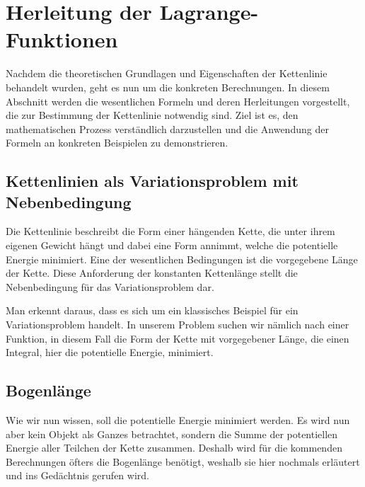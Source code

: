 %
%
%
%
\section{Herleitung der Lagrange-Funktionen\label{kettenlinie:section:Herleitung der Lagrange-Funktionen}}
Nachdem die theoretischen Grundlagen und Eigenschaften der Kettenlinie behandelt wurden, geht es nun um die konkreten Berechnungen.
In diesem Abschnitt werden die wesentlichen Formeln und deren Herleitungen vorgestellt, die zur Bestimmung der Kettenlinie notwendig sind.
Ziel ist es, den mathematischen Prozess verständlich darzustellen und die Anwendung der Formeln an konkreten Beispielen zu demonstrieren.

\subsection{Kettenlinien als Variationsproblem mit Nebenbedingung
\label{kettenlinie:subsection:Kettenlinien als Variationsproblem mit Nebenbedingung}}
Die Kettenlinie beschreibt die Form einer hängenden Kette, die unter ihrem eigenen Gewicht hängt und dabei eine Form annimmt, welche die potentielle Energie minimiert.
Eine der wesentlichen Bedingungen ist die vorgegebene Länge der Kette.
Diese Anforderung der konstanten Kettenlänge stellt die Nebenbedingung für das Variationsproblem dar.

Man erkennt daraus, dass es sich um ein klassisches Beispiel für ein Variationsproblem handelt.
In unserem Problem suchen wir nämlich nach einer Funktion, in diesem Fall die Form der Kette mit vorgegebener Länge, die einen Integral, hier die potentielle Energie, minimiert.

\subsection{Bogenlänge
\label{kettenlinie:subsection:Bogenlänge}}
Wie wir nun wissen, soll die potentielle Energie minimiert werden.
Es wird nun aber kein Objekt als Ganzes betrachtet, sondern die Summe der potentiellen Energie aller Teilchen der Kette zusammen.
%
Deshalb wird für die kommenden Berechnungen öfters die Bogenlänge benötigt, weshalb sie hier nochmals erläutert und ins Gedächtnis gerufen wird.
%

